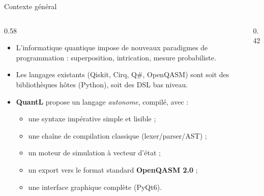 \documentclass[10pt]{beamer}
\begin{document}
\begin{frame}{Contexte général}
  \begin{columns}[T]
    \begin{column}{0.58\textwidth}
      \begin{itemize}
        \item L'informatique quantique impose de nouveaux paradigmes de programmation : \alert{superposition}, \alert{intrication}, \alert{mesure probabiliste}.
        \item Les langages existants (Qiskit, Cirq, Q\#, OpenQASM) sont soit des bibliothèques hôtes (Python), soit des DSL bas niveau.
        \item \textbf{QuantL} propose un langage \emph{autonome}, compilé, avec :
        \begin{itemize}
          \item une syntaxe impérative simple et lisible ;
          \item une chaîne de compilation classique (lexer/parser/AST) ;
          \item un moteur de simulation à vecteur d'état ;
          \item un export vers le format standard \textbf{OpenQASM 2.0} ;
          \item une interface graphique complète (PyQt6).
        \end{itemize}
      \end{itemize}
    \end{column}
    \begin{column}{0.42\textwidth}
      \centering
    \end{column}
  \end{columns}
\end{frame}
\end{document}
